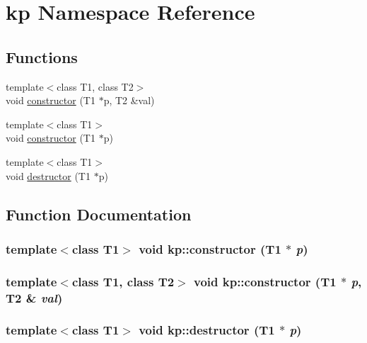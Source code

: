 \hypertarget{namespacekp}{
\section{kp Namespace Reference}
\label{namespacekp}
}


\subsection*{Functions}
\begin{CompactItemize}
\item 
{\footnotesize template$<$class T1, class T2$>$ }\\void \hyperlink{namespacekp_d1c6c23984a78bfc8336c7ca244d6f1c}{constructor} (T1 $\ast$p, T2 \&val)
\item 
{\footnotesize template$<$class T1$>$ }\\void \hyperlink{namespacekp_b625db515f044b7ddaa92769e2e6d745}{constructor} (T1 $\ast$p)
\item 
{\footnotesize template$<$class T1$>$ }\\void \hyperlink{namespacekp_a6813c11eeb1c091cdd1eff62de70914}{destructor} (T1 $\ast$p)
\end{CompactItemize}


\subsection{Function Documentation}
\hypertarget{namespacekp_b625db515f044b7ddaa92769e2e6d745}{
\subsubsection{\setlength{\rightskip}{0pt plus 5cm}template$<$class T1$>$ void kp::constructor (T1 $\ast$ {\em p})}}
\label{namespacekp_b625db515f044b7ddaa92769e2e6d745}


\hypertarget{namespacekp_d1c6c23984a78bfc8336c7ca244d6f1c}{
\subsubsection{\setlength{\rightskip}{0pt plus 5cm}template$<$class T1, class T2$>$ void kp::constructor (T1 $\ast$ {\em p}, \/  T2 \& {\em val})}}
\label{namespacekp_d1c6c23984a78bfc8336c7ca244d6f1c}


\hypertarget{namespacekp_a6813c11eeb1c091cdd1eff62de70914}{
\subsubsection{\setlength{\rightskip}{0pt plus 5cm}template$<$class T1$>$ void kp::destructor (T1 $\ast$ {\em p})}}
\label{namespacekp_a6813c11eeb1c091cdd1eff62de70914}


